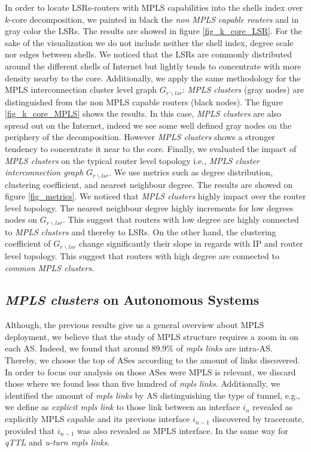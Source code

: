 In order to locate LSRs-routers
with MPLS capabilities into the shells index over $k$-core decomposition, we painted in black the 
\textit{non MPLS capable routers} and in gray color the LSRs. The
results are showed in figure \ref{fig_k_core_LSR}. For the sake of the
visualization we do not include neither the shell index, degree scale nor edges between shells. We noticed
that the LSRs are commonly distributed around the different shells of Internet
but  lightly tends to concentrate with more density nearby to the core.
Additionally, we apply the same methodology for the MPLS interconnection cluster level graph
$G_{r\backslash lsr}$: \textit{MPLS clusters} (gray nodes) are distinguished from the non MPLS capable routers (black nodes). The figure \ref{fig_k_core_MPLS} shows the
results. In this case,  \textit{MPLS clusters}  are also spread out on the Internet, indeed we see some well defined gray nodes on the periphery of the decomposition. However \textit{MPLS clusters} shows a stronger tendency to
concentrate it near to the core. Finally, we evaluated the impact of \textit{MPLS clusters} on the typical router level topology i.e., \textit{MPLS cluster interconnection graph} $G_{r \backslash lsr }$. We use metrics such as degree distribution, clustering coefficient, and nearest neighbour degree. The results are showed on figure \ref{fig_metrics}. We noticed that \textit{MPLS clusters} highly impact over the router level topology. The nearest neighbour degree highly increments for low degrees nodes on $G_{r \backslash lsr }$. This suggest that routers with low degree are highly connected to \textit{MPLS clusters} and thereby to LSRs. On the other hand, the clustering coefficient of $G_{r \backslash lsr }$ change significantly their slope in regards with IP and router level topology. This suggest that routers with high degree are connected to \textit{common} \textit{MPLS clusters}.


\subsection{\textit{MPLS clusters} on Autonomous Systems}\label{cluster.as}

Although, the previous results give us a general overview about MPLS deployment,
we believe that the study of MPLS structure requires a zoom in on each AS. Indeed, we found that around
$89.9\%$ of \textit{mpls links} are intra-AS.  Thereby, we choose the top of ASes according to the amount of  links discovered. In order to focus our analysis on those ASes were MPLS is relevant, we discard those where we found less than five hundred of \textit{mpls links}. Additionally, we identified  the amount of \textit{mpls links} by AS distinguishing the type of tunnel, e.g., we define as \textit{explicit mpls link} to those link between an interface $i_{n}$ revealed as explicitly MPLS capable and its previous interface $i_{n-1}$ discovered by traceroute, provided that $i_{n-1}$ was also revealed as MPLS interface. In the same way for \textit{qTTL} and  \textit{u-turn mpls links}.

